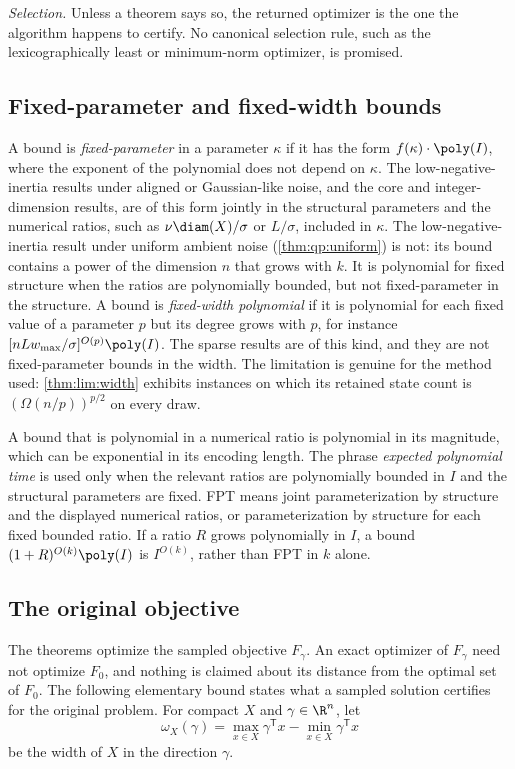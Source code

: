 \emph{Selection.} Unless a theorem says so, the returned optimizer is the
one the algorithm happens to certify. No canonical selection rule, such as
the lexicographically least or minimum-norm optimizer, is promised.

\subsection{Fixed-parameter and fixed-width bounds}\label{sec:model:parameters}

A bound is \emph{fixed-parameter} in a parameter $\kappa$ if it has the form
$f(\kappa)\cdot\poly(I)$, where the exponent of the polynomial does not
depend on $\kappa$. The low-negative-inertia results under aligned or
Gaussian-like noise, and the core and integer-dimension results, are of this
form jointly in the structural parameters and the numerical ratios, such as
$\nu\diam(X)/\sigma$ or $L/\sigma$, included in $\kappa$. The
low-negative-inertia result under uniform ambient noise
(\cref{thm:qp:uniform}) is not: its bound contains a power of the dimension
$n$ that grows with $k$. It is polynomial for fixed structure when the ratios
are polynomially bounded, but not fixed-parameter in the structure. A bound is
\emph{fixed-width polynomial} if it is polynomial for each fixed value of a
parameter $p$ but its degree grows with $p$, for instance
$[nLw_{\max}/\sigma]^{O(p)}\poly(I)$. The sparse results are of this kind,
and they are not fixed-parameter bounds in the width. The limitation is
genuine for the method used: \cref{thm:lim:width} exhibits instances on
which its retained state count is $(\Omega(n/p))^{p/2}$ on every draw.

A bound that is polynomial in a numerical ratio is polynomial in its
magnitude, which can be exponential in its encoding length. The phrase
\emph{expected polynomial time} is used only when the relevant ratios are
polynomially bounded in $I$ and the structural parameters are fixed.
FPT means joint parameterization by structure and the displayed numerical
ratios, or parameterization by structure for each fixed bounded ratio.
If a ratio $R$ grows polynomially in $I$, a bound
$(1+R)^{O(k)}\poly(I)$ is $I^{O(k)}$, rather than FPT in $k$ alone.

\subsection{The original objective}\label{sec:model:original}

The theorems optimize the sampled objective $F_\gamma$. An exact optimizer
of $F_\gamma$ need not optimize $F_0$, and nothing is claimed about its
distance from the optimal set of $F_0$. The following elementary bound states
what a sampled solution certifies for the original problem. For compact $X$
and $\gamma\in\R^n$, let
\[
 \omega_X(\gamma)=\max_{x\in X}\gamma^{\mathsf T}x-\min_{x\in X}\gamma^{\mathsf T}x
\]
be the width of $X$ in the direction $\gamma$.

